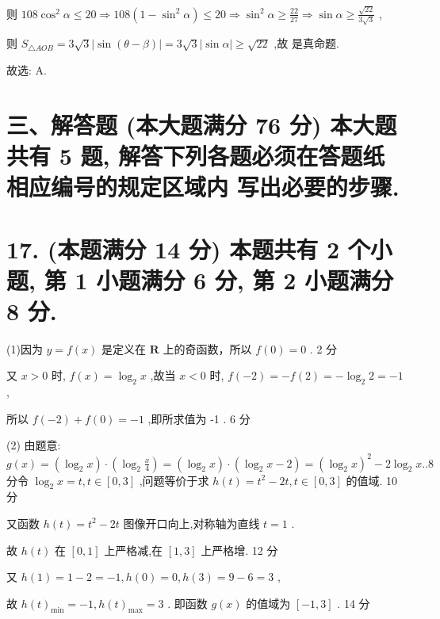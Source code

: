 \documentclass[10pt]{article}
\newcommand*\circled[1]{\tikz[baseline=(char.base)]{\node[shape=circle,draw,inner sep=1.5pt] (char) {\small #1};}}
\begin{document}
则 \({108}{\cos }^{2}\alpha  \leq  {20} \Rightarrow  {108}\left( {1 - {\sin }^{2}\alpha }\right)  \leq  {20} \Rightarrow  {\sin }^{2}\alpha  \geq  \frac{22}{27} \Rightarrow  \sin \alpha  \geq  \frac{\sqrt{22}}{3\sqrt{3}}\) ,

则 \({S}_{\bigtriangleup {AOB}} = 3\sqrt{3}\left| {\sin \left( {\theta  - \beta }\right) }\right|  = 3\sqrt{3}\left| {\sin \alpha }\right|  \geq  \sqrt{22}\) ,故 \circled{2} 是真命题.

故选: A.

\section*{三、解答题 (本大题满分 76 分) 本大题共有 5 题, 解答下列各题必须在答题纸相应编号的规定区域内 写出必要的步骤.}

\section*{17. (本题满分 14 分) 本题共有 2 个小题, 第 1 小题满分 6 分, 第 2 小题满分 8 分.}

(1)因为 \(y = f\left( x\right)\) 是定义在 \(\mathbf{R}\) 上的奇函数，所以 \(f\left( 0\right)  = 0\) . 2 分

又 \(x > 0\) 时, \(f\left( x\right)  = {\log }_{2}x\) ,故当 \(x < 0\) 时, \(f\left( {-2}\right)  =  - f\left( 2\right)  =  - {\log }_{2}2 =  - 1\) ,

所以 \(f\left( {-2}\right)  + f\left( 0\right)  =  - 1\) ,即所求值为 -1 . 6 分

(2) 由题意: \(g\left( x\right)  = \left( {{\log }_{2}x}\right)  \cdot  \left( {{\log }_{2}\frac{x}{4}}\right)  = \left( {{\log }_{2}x}\right)  \cdot  \left( {{\log }_{2}x - 2}\right)  = {\left( {\log }_{2}x\right) }^{2} - 2{\log }_{2}x.{.8}\) 分令 \({\log }_{2}x = t,t \in  \left\lbrack  {0,3}\right\rbrack\) ,问题等价于求 \(h\left( t\right)  = {t}^{2} - {2t},t \in  \left\lbrack  {0,3}\right\rbrack\) 的值域. 10 分

又函数 \(h\left( t\right)  = {t}^{2} - {2t}\) 图像开口向上,对称轴为直线 \(t = 1\) .

故 \(h\left( t\right)\) 在 \(\left\lbrack  {0,1}\right\rbrack\) 上严格减,在 \(\left\lbrack  {1,3}\right\rbrack\) 上严格增. 12 分

又 \(h\left( 1\right)  = 1 - 2 =  - 1,h\left( 0\right)  = 0,h\left( 3\right)  = 9 - 6 = 3\) ,

故 \(h{\left( t\right) }_{\min } =  - 1,h{\left( t\right) }_{\max } = 3\) . 即函数 \(g\left( x\right)\) 的值域为 \(\left\lbrack  {-1,3}\right\rbrack\) . 14 分
\end{document}
